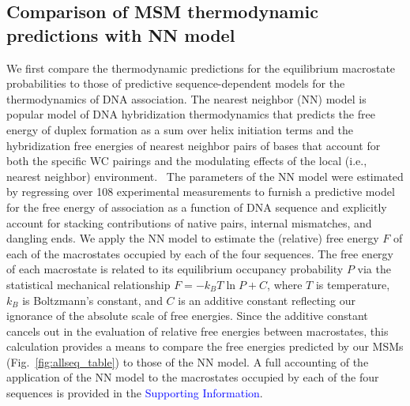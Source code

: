 \documentclass[journal=jpcbfk,manuscript=article]{achemso}
\newcommand*{\blauw}[1]{\textcolor{blue}{#1}}
\begin{document}
\subsection{Comparison of MSM thermodynamic predictions with NN model} \label{sec:NN}

We first compare the thermodynamic predictions for the equilibrium macrostate probabilities to those of predictive sequence-dependent models for the thermodynamics of DNA association. The nearest neighbor (NN) model is popular model of DNA hybridization thermodynamics that predicts the free energy of duplex formation as a sum over helix initiation terms and the hybridization free energies of nearest neighbor pairs of bases that account for both the specific WC pairings and the modulating effects of the local (i.e., nearest neighbor) environment.~\citep{SantaLucia1998AThermodynamics, Santalucia2004TM} The parameters of the NN model were estimated by regressing over 108 experimental measurements to furnish a predictive model for the free energy of association as a function of DNA sequence and explicitly account for stacking contributions of native pairs, internal mismatches, and dangling ends. We apply the NN model to estimate the (relative) free energy $F$ of each of the macrostates occupied by each of the four sequences. The free energy of each macrostate is related to its equilibrium occupancy probability $P$ via the statistical mechanical relationship $F = -k_B T \ln P + C$, where $T$ is temperature, $k_B$ is Boltzmann's constant, and $C$ is an additive constant reflecting our ignorance of the absolute scale of free energies. Since the additive constant cancels out in the evaluation of relative free energies between macrostates, this calculation provides a means to compare the free energies predicted by our MSMs (Fig.~\ref{fig:allseq_table}) to those of the NN model. A full accounting of the application of the NN model to the macrostates occupied by each of the four sequences is provided in the \blauw{Supporting Information}.
\end{document}
